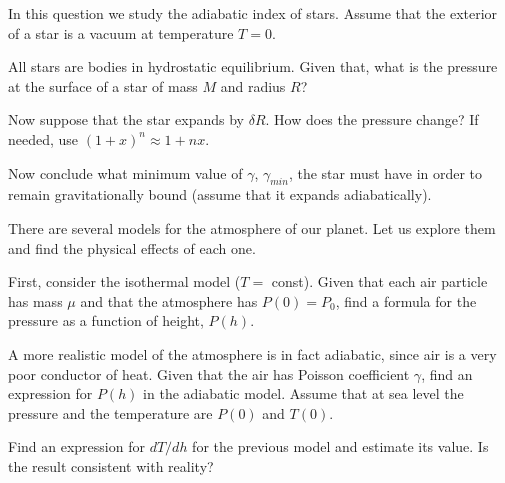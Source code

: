 \documentclass[11pt]{article}
\begin{document}
\begin{pproblem}
    In this question we study the adiabatic index of stars. Assume that the exterior of a star is a vacuum at temperature \(T=0\).
    \begin{alternativas}
        \item All stars are bodies in hydrostatic equilibrium. Given that, what is the pressure at the surface of a star of mass \(M\) and radius \(R\)?
        \item Now suppose that the star expands by \(\delta R\). How does the pressure change? If needed, use \((1+x)^n\approx 1+nx\).
        \item Now conclude what minimum value of \(\gamma\), \(\gamma_{min}\), the star must have in order to remain gravitationally bound (assume that it expands adiabatically).
    \end{alternativas}


\end{pproblem}

\begin{pproblem}
    There are several models for the atmosphere of our planet. Let us explore them and find the physical effects of each one.
    \begin{alternativas}
        \item First, consider the isothermal model (\(T=\) const). Given that each air particle has mass \(\mu\) and that the atmosphere has \(P(0) = P_0\), find a formula for the pressure as a function of height, \(P(h)\).
        \item A more realistic model of the atmosphere is in fact adiabatic, since air is a very poor conductor of heat. Given that the air has Poisson coefficient \(\gamma\), find an expression for \(P(h)\) in the adiabatic model. Assume that at sea level the pressure and the temperature are \(P(0)\) and \(T(0)\).
        \item Find an expression for \(dT/dh\) for the previous model and estimate its value. Is the result consistent with reality?
    \end{alternativas}


\end{pproblem}
\end{document}
